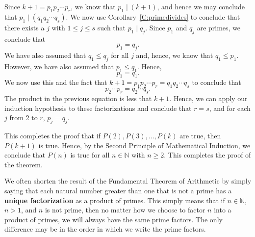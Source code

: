 \begin{myproof}
Since  $k + 1 = p_1 p_2  \cdots p_r $, we know that  $p_1 \mid \left( {k + 1} \right)$, and hence we may conclude that $p_1 \mid \left( {q_1 q_2  \cdots q_s } \right)$.  We now use Corollary~\ref{C:primedivides} to conclude that there exists a  $j$  with  
$1 \leq j \leq s$   such that  $p_1 \mid q_j $.  Since  $p_1 $  and  $q_j $ are primes, we conclude that
\[
p_1  = q_j.
\]
We have also assumed that  $q_1  \leq q_j$ for all $j$ and, hence, we know that  
$q_1  \leq p_1 $.  However, we have also assumed that  $p_1  \leq q_1 $.  Hence,
\[
p_1  = q_1.
\]
We now use this and the fact that  $k + 1 = p_1 p_2  \cdots p_r  = q_1 q_2  \cdots q_s $ to conclude that
\[
p_2  \cdots p_r  = q_2  \cdots q_s.
\]
The product in the previous equation is less that  $k + 1$. Hence, we can apply our induction hypothesis to these factorizations and conclude that  $r = s$, and for each  $j$  from  2  to  $r$,  $p_j  = q_j $.

This completes the proof that if  
$P( 2 ), P( 3 ),  \ldots , P( k )$ are true, then 
$P( {k + 1} )$ is true.  Hence, by the Second Principle of Mathematical Induction, we conclude that  $P( n )$ is true for all  $n \in \mathbb{N}$ with  $n \geq 2$.  This completes the proof of the theorem.
\end{myproof}
%
\hbreak
%
\noindent
\note  We often shorten the result of the Fundamental Theorem of Arithmetic by simply saying that each natural number greater than one that is not a prime has a \textbf{unique factorization}
%
 as a product of primes.  This simply means that if  $n \in \mathbb{N}$, $n > 1$, and  $n$  is not prime, then no matter how we choose to factor  $n$  into a product of primes, we will always have the same prime factors.  The only difference may be in the order in which we write the prime factors.


\endinput

